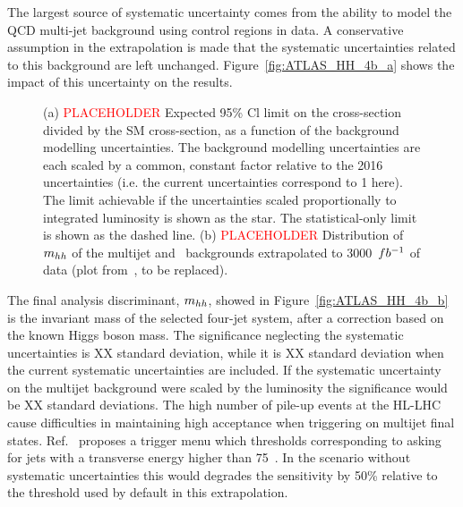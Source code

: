 The largest source of systematic uncertainty comes from the ability to model the QCD multi-jet background using control regions in data. A conservative assumption in the extrapolation is made that the systematic uncertainties related to this background are left unchanged. Figure~\ref{fig:ATLAS_HH_4b_a} shows the impact of this uncertainty on the results.


\begin{figure}[!htb]
\centering 
{} 
\caption{(a) \textcolor{red}{PLACEHOLDER} Expected 95\% Cl limit on the cross-section divided by the SM cross-section, as a function of the background modelling uncertainties. The background modelling uncertainties are each scaled by a common, constant factor relative to the 2016 uncertainties (i.e. the current uncertainties correspond to 1 here). 
The limit achievable if the uncertainties scaled proportionally to integrated luminosity is shown as the star. 
The statistical-only limit is shown as the dashed line. (b) \textcolor{red}{PLACEHOLDER} Distribution of $m_{hh}$ of the multijet and \ttbar\ backgrounds extrapolated to 3000~$fb^{-1}$ of data (plot from~\cite{Aaboud:2018knk}, to be replaced).} 
\label{fig:ATLAS_HH_4b} 
\end{figure}

The final analysis discriminant, $m_{hh}$, showed in Figure~\ref{fig:ATLAS_HH_4b_b} is the invariant mass of the selected four-jet system, after a correction based on the known Higgs boson mass. The significance neglecting the systematic uncertainties is XX standard deviation, while it is XX standard deviation when the current systematic uncertainties are included. If the systematic uncertainty on the multijet background were scaled by the luminosity the significance would be XX standard deviations.
The high number of pile-up events at the HL-LHC cause difficulties in maintaining high acceptance when triggering on multijet final states. Ref.~\cite{Collaboration:2285584} proposes a trigger menu which thresholds corresponding to asking for jets with a transverse energy higher than 75~\UGeV. In the scenario without systematic uncertainties this would degrades the sensitivity by 50\% relative to the threshold used by default in this extrapolation.


